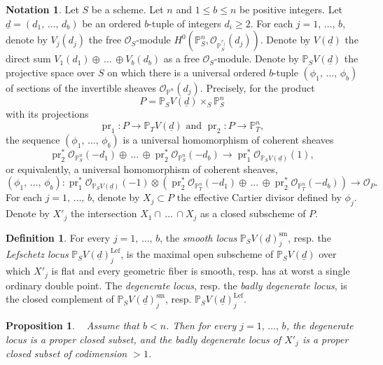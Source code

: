 \documentclass[11pt]{article}
\newtheorem{prop}[theo]{Proposition}
\theoremstyle{definition}
\newtheorem{defi}[theo]{Definition}
\newtheorem{nota}[theo]{Notation}
\numberwithin{equation}{section}
\numberwithin{figure}{section}
\numberwithin{table}{section}
\newcommand{\mbb}{\mathbb}
\newcommand{\PP}{\mbb{P}}
\newcommand{\mc}{\mathcal}
\newcommand{\OO}{\mc{O}}
\newcommand{\ul}{\underline}
\newcommand{\Xx}{X}
\newcommand{\cb}{b}
\DeclareMathOperator{\sm}{sm}
\DeclareMathOperator{\Lef}{Lef}
\DeclareMathOperator{\prm}{pr}
\begin{document}
\begin{nota}\label{notat-CI-b}
Let $S$ be a scheme. Let $n$ and $1\leq b \leq n$ be positive integers. Let $\ul{d}=(d_1,\,\dots,\,d_b)$ be an ordered $b$-tuple of integers $d_i\geq 2$. For each $j=1,\,\dots,\,\cb$, denote by $V_j(d_j)$ the free $\OO_S$-module $H^0(\PP^{n}_S,\OO_{\PP^{r_j}_S}(d_j))$. Denote by $V(\underline{d})$ the direct sum $V_1(d_1)\oplus\,\dots\,\oplus V_\cb(d_\cb)$ as a free $\OO_S$-module. Denote by $\PP_S V(\underline{d})$ the projective space over $S$ on which there is a universal ordered $\cb$-tuple $(\phi_1,\,\dots,\,\phi_\cb)$ of sections of the invertible sheaves $\OO_{\PP^{n}}(d_j)$. Precisely, for the product
\[
P=\PP_S V(\underline{d}) \times_S \PP^n_S
\]
with its projections
\[
\prm_1:P\to
\PP_TV(\underline{d}) \text{ and }
\prm_2:P\to \PP_T^{n},
\]
the sequence $(\phi_1,\,\dots,\,\phi_\cb)$ is a universal homomorphism of coherent sheaves
\[
\prm_2^*\OO_{\PP^{n}_S}(-d_1)\oplus\,\dots\, \oplus
\prm_2^*\OO_{\PP^{n}_S}(-d_\cb) \to \prm_1^*\OO_{\PP_S V(\underline{d})}(1),
\]
or equivalently, a universal homomorphism of coherent sheaves,
\[
(\phi_1,\,\dots,\,\phi_\cb):\prm_1^*\OO_{\PP_S V(\underline{d})}(-1)\otimes\left(\prm_2^*\OO_{\PP^{n}_T}(-d_1)\oplus
\,\dots\,\oplus
\prm_2^*\OO_{\PP^{n}_T}(-d_\cb)\right) \to \OO_P.
\]
For each $j=1,\,\dots,\,b$, denote by $\Xx_j\subset P$ the effective Cartier divisor defined by $\phi_j$. Denote by $\Xx'_j$ the intersection $\Xx_1\cap\,\dots\,\cap \Xx_j$ as a closed subscheme of $P$.
\end{nota}

\begin{defi} \label{defn-CI2-b}
For every $j=1,\,\dots,\,\cb$, the \emph{smooth locus} $\PP_S V(\underline{d})^{\sm}_j$, resp. the
\emph{Lefschetz locus} $\PP_S V(\underline{d})^{\Lef}_j$, is the maximal open subscheme of $\PP_S V(\underline{d})$ over which $\Xx'_j$ is flat and every geometric fiber is smooth, resp. has at worst a single ordinary double point. The \emph{degenerate locus}, resp. the
\emph{badly degenerate locus}, is the closed complement of $\PP_S V(\underline{d})_j^{\sm}$, resp. $\PP_S V(\ul{d})_j^{\Lef}$.
\end{defi}

\begin{prop}
~\cite[Exposé XVII, Théorème
2.5]{SGA7II} \label{prop-Lef-b}
Assume that $\cb < n$. Then for every $j=1,\,\dots,\,\cb$, the degenerate locus is a proper closed subset, and the badly degenerate locus of $\Xx'_j$ is a proper closed subset of codimension $>1$.
\end{prop}
\end{document}
